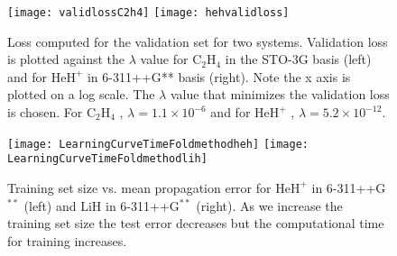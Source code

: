 \documentclass[10pt]{article}
\newcommand{\heh}{\ensuremath{\text{HeH}^+} }
\newcommand{\lih}{\ensuremath{\text{LiH}} }
\newcommand{\ethylene}{\ensuremath{\text{C}_2\text{H}_4} }
\begin{document}
\begin{figure}[t]
\centering
\texttt{[image: validlossC2h4]}
\texttt{[image: hehvalidloss]}
\caption{Loss computed for the validation set for two systems. Validation loss is plotted against the $\lambda$ value for \ethylene in the STO-3G basis (left) and for \heh in 6-311++G** basis (right). Note the x axis is plotted on a log scale. The $\lambda$ value that minimizes the validation loss is chosen. For \ethylene, $\lambda = 1.1\times 10^{-6}$ and for \heh, $\lambda = 5.2 \times 10^{-12}$. }
\label{fig1}
\end{figure}
\begin{figure}[t]
\centering
\texttt{[image: LearningCurveTimeFoldmethodheh]}
\texttt{[image: LearningCurveTimeFoldmethodlih]}
\caption{Training set size vs. mean propagation error for \heh in 6-311++G$^{**}$ (left) and \lih in 6-311++G$^{**}$ (right). As we increase the training set size the test error decreases but the computational time for training increases.}
\label{fig:learningcurve}
\end{figure}


\end{document}
